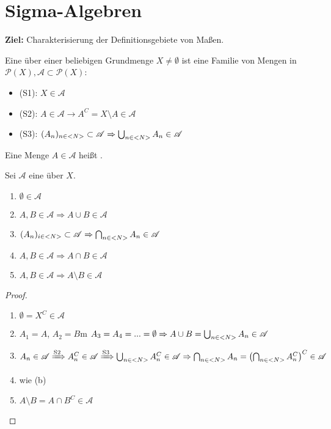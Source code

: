 \section{Sigma-Algebren}

\textbf{Ziel:} Charakterisierung der Definitionsgebiete von Maßen.

\begin{definition}[\sigmalg, messbar]
	Eine \begriff{\sigmalg} über einer beliebigen Grundmenge $X \neq \emptyset$ ist eine Familie von Mengen in $\mathscr{P}(X), \mathscr{A} \subset \mathscr{P}(X)$:
	\begin{itemize}
		\item (S1): $X \in \mathscr{A}$
		\item (S2): $A \in \mathscr{A} \to A^C = X \setminus A \in \mathscr{A}$
		\item (S3): $(A_n)_{n\in <N>} \subset \mathscr{A} \Rightarrow \bigcup_{n\in <N>}A_n \in \mathscr{A}$
	\end{itemize}
	Eine Menge $A\in\mathscr{A}$ heißt .
\end{definition}

\begin{proposition}
	Sei $\mathscr{A}$ eine \sigmalg über $X$.
	\begin{enumerate}[label=(\alph*)]
		\item $\emptyset\in\mathscr{A}$
		\item $A,B\in\mathscr{A}\Rightarrow A\cup B\in\mathscr{A}$
		\item $(A_n)_{i\in<N>}\subset\mathscr{A}\Rightarrow\bigcap_{n\in <N>}A_n\in\mathscr{A}$
		\item $A,B\in\mathscr{A}\Rightarrow A\cap B\in\mathscr{A}$
		\item $A,B\in\mathscr{A}\Rightarrow A\setminus B\in\mathscr{A}$
	\end{enumerate}
\end{proposition}
\begin{proof}
	\begin{enumerate}[label=(\alph*)]
		\item $\emptyset=X^C\in\mathscr{A}$
		\item $A_1=A$, $A_2=B$m $A_3=A_4=...=\emptyset\Rightarrow A\cup B=\bigcup_{n\in <N>} A_n\in\mathscr{A}$
		\item $A_n\in\mathscr{A}\xRightarrow{\text{S2}}A_n^C\in\mathscr{A}\xRightarrow{\text{S3}}\bigcup_{n\in <N>} A_n^C\in\mathscr{A}\Rightarrow\bigcap_{n\in <N>}A_n=\left(\bigcap_{n\in <N>} A_n^C\right)^C\in\mathscr{A}$
		\item wie (b)
		\item $A\setminus B=A\cap B^C\in\mathscr{A}$
	\end{enumerate}
\end{proof}

